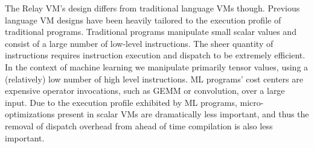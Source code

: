 The Relay VM's design differs from traditional language VMs though.
Previous language VM designs have been heavily
  tailored to the execution profile of traditional programs.
Traditional programs manipulate small scalar values
  and consist of a large number of low-level instructions.
The sheer quantity of instructions requires instruction execution
  and dispatch to be extremely efficient.
In the context of machine learning we manipulate primarily tensor values,
  using a (relatively) low number of high level instructions.
ML programs’ cost centers are expensive operator invocations,
  such as GEMM or convolution, over a large input.
Due to the execution profile exhibited by ML programs,
  micro-optimizations present in scalar VMs are dramatically less important,
  and thus the removal of dispatch overhead from ahead of time compilation
  is also less important.





